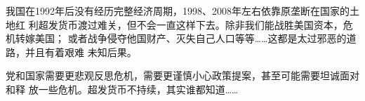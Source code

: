我国在1992年后没有经历完整经济周期，1998、2008年左右依靠原垄断在国家的土地红
利超发货币渡过难关，但不会一直这样下去。除非我们能战胜美国资本，危机转嫁美国；
或者战争侵夺他国财产、灭失自己人口等等……这都是太过邪恶的道路，并且有着艰难
未知后果。

党和国家需要更悲观反思危机，需要更谨慎小心政策提案，甚至可能需要坦诚面对和释
放一些危机。超发货币不持续，其实谁都知道……





















